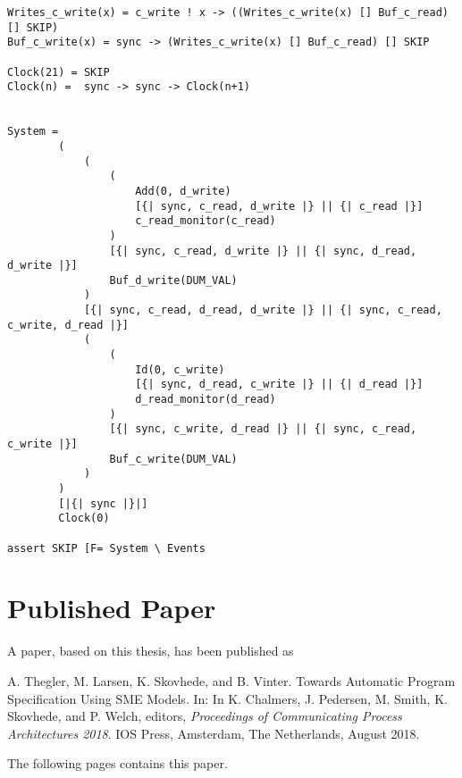 \begin{verbatim}
Writes_c_write(x) = c_write ! x -> ((Writes_c_write(x) [] Buf_c_read) [] SKIP)
Buf_c_write(x) = sync -> (Writes_c_write(x) [] Buf_c_read) [] SKIP

Clock(21) = SKIP
Clock(n) =  sync -> sync -> Clock(n+1)


System =
        (
            (
                (
                    Add(0, d_write)
                    [{| sync, c_read, d_write |} || {| c_read |}]
                    c_read_monitor(c_read)
                )
                [{| sync, c_read, d_write |} || {| sync, d_read, d_write |}]
                Buf_d_write(DUM_VAL)
            )
            [{| sync, c_read, d_read, d_write |} || {| sync, c_read, c_write, d_read |}]
            (
                (
                    Id(0, c_write)
                    [{| sync, d_read, c_write |} || {| d_read |}]
                    d_read_monitor(d_read)
                )
                [{| sync, c_write, d_read |} || {| sync, c_read, c_write |}]
                Buf_c_write(DUM_VAL)
            )
        )
        [|{| sync |}|]
        Clock(0)

assert SKIP [F= System \ Events
\end{verbatim}


\chapter{Published Paper}
\label{app:paper}
\noindent A paper, based on this thesis, has been published as

\begin{center}
\begin{minipage}{0.8\textwidth}
    A. Thegler, M. Larsen, K. Skovhede, and B. Vinter. Towards Automatic Program Specification Using SME Models. In: In K. Chalmers, J. Pedersen, M. Smith, K. Skovhede, and P. Welch,
    editors, {\itshape Proceedings of Communicating Process Architectures
    2018}. IOS Press, Amsterdam, The Netherlands,
    August 2018.
\end{minipage}
\end{center}
The following pages contains this paper.
